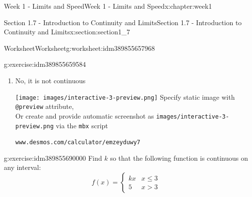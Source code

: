 \documentclass[oneside,10pt,]{book}
\newcommand{\mono}[1]{\texttt{#1}}
\numberwithin{equation}{section}
\newlength{\qrsize}
\newlength{\previewwidth}
\begin{document}
\begin{chapterptx}{Week 1 - Limits and Speed}{}{Week 1 - Limits and Speed}{}{}{x:chapter:week1}
\begin{sectionptx}{Section 1.7 - Introduction to Continuity and Limits}{}{Section 1.7 - Introduction to Continuity and Limits}{}{}{x:section:section1_7}
\begin{worksheet-subsection}{Worksheet}{}{Worksheet}{}{}{g:worksheet:idm389855657968}
\begin{divisionexercise}{1}{}{}{g:exercise:idm389855659584}
\begin{enumerate}[label=(\alph*)]
\begin{tcbraster}[raster columns=2, raster column skip=1pt, raster halign=center, raster force size=false, raster left skip=0pt, raster right skip=0pt]
\begin{tcolorbox}[previewstyle, width=\previewwidth]
\end{tcolorbox}%
\begin{tcolorbox}[qrstyle]%
{\hypersetup{urlcolor=black}}%
\end{tcolorbox}%
\begin{tcolorbox}[captionstyle]%
\small \mono{www.desmos.com/calculator/kslwpjxdgf}\end{tcolorbox}%
\end{tcbraster}%
%
\item{}No, it is not continuous%
\par
\setlength{\qrsize}{9em}
\setlength{\previewwidth}{\linewidth}
\addtolength{\previewwidth}{-\qrsize}
\begin{tcbraster}[raster columns=2, raster column skip=1pt, raster halign=center, raster force size=false, raster left skip=0pt, raster right skip=0pt]%
\begin{tcolorbox}[previewstyle, width=\previewwidth]%
%
{\texttt{[image: images/interactive-3-preview.png]}}%
{\small{}Specify static image with \mono{@preview} attribute,\\Or create and provide automatic screenshot as \mono{images/interactive-3-preview.png} via the \mono{mbx} script}%
\end{tcolorbox}%
\begin{tcolorbox}[qrstyle]%
{\hypersetup{urlcolor=black}}%
\end{tcolorbox}%
\begin{tcolorbox}[captionstyle]%
\small \mono{www.desmos.com/calculator/emzeyduwy7}\end{tcolorbox}%
\end{tcbraster}%
%
\end{enumerate}
\end{divisionexercise}%
\begin{divisionexercise}{2}{}{}{g:exercise:idm389855690000}%
Find \(k\) so that the following function is continuous on any interval:%
\begin{equation*}
f(x) = \left \{ \begin{matrix} kx & x \leq 3 \\ 5 & x > 3 \end{matrix} \right. 
\end{equation*}
%
\par
\setlength{\qrsize}{9em}
\setlength{\previewwidth}{\linewidth}
\addtolength{\previewwidth}{-\qrsize}

\end{divisionexercise}
\end{worksheet-subsection}
\end{sectionptx}
\end{chapterptx}
\end{document}
